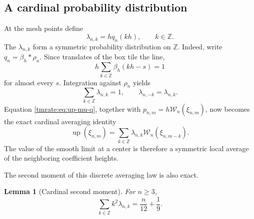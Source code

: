 \documentclass[11pt,oneside]{article}
\newtheorem{lemma}[theorem]{Lemma}
\theoremstyle{definition}
\theoremstyle{remark}
\newcommand{\Z}{\mathbb Z}
\newcommand{\Up}{\operatorname{up}}
\begin{document}
\subsection{A cardinal probability distribution}

At the mesh points define
\begin{equation}
 \lambda_{n,k}=h q_n(kh),\qquad k\in\Z.                    \label{tmrate:eq:lambda-def}
\end{equation}
The $\lambda_{n,k}$ form a symmetric probability distribution on $\Z$.
Indeed, write $q_n=\beta_h*\rho_n$.  Since translates of the box tile the line,
\begin{equation}
 h\sum_{k\in\Z}\beta_h(kh-s)=1                            \label{tmrate:eq:box-partition}
\end{equation}
for almost every $s$.  Integration against $\rho_n$ yields
\begin{equation}
 \sum_{k\in\Z}\lambda_{n,k}=1,
 \qquad \lambda_{n,-k}=\lambda_{n,k}.                     \label{tmrate:eq:lambda-probability}
\end{equation}
Equation \eqref{tmrate:eq:up-mu-q}, together with
$p_{n,m}=h\mathcal W_n(\xi_{n,m})$, now becomes the exact cardinal averaging
identity
\begin{equation}
 \Up(\xi_{n,m})=
 \sum_{k\in\Z}\lambda_{n,k}
 \mathcal W_n(\xi_{n,m-k}).                               \label{tmrate:eq:cardinal-average}
\end{equation}
The value of the smooth limit at a center is therefore a symmetric local average
of the neighboring coefficient heights.

The second moment of this discrete averaging law is also exact.

\begin{lemma}[Cardinal second moment]
\label{tmrate:lem:cardinal-second-moment}
For $n\ge3$,
\begin{equation}
 \sum_{k\in\Z}k^2\lambda_{n,k}
 =\frac{n}{12}+\frac19.                                   \label{tmrate:eq:lambda-second-moment}
\end{equation}
\end{lemma}
\end{document}
